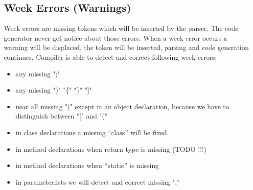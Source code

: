 \subsection{Week Errors (Warnings)}
\label{label_week_errors}
Week errors are missing tokens which will be inserted by the parser.
The code generator never get notice about those errors. When a week error occurs a warning will be displaced, the token will be
inserted, parsing and code generation continues.
Compiler is able to detect and correct following week errors:
\begin{itemize}
  \item any missing ";"
  \item any missing ")" "\{" "\}" "]" 
  \item near all missing "(" except in an object declaration, because we have to distinguish between "[" and "(" 
  \item in class declarations a missing ``class'' will be fixed.
  \item in method declarations when return type is missing (TODO !!!)
  \item in method declarations when ``static'' is missing
  \item in parameterlists we will detect and correct missing ","
\end{itemize}

